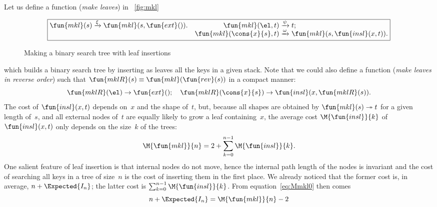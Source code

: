 Let us define a function 
 (\emph{make leaves}) in \fig~\vref{fig:mkl}
\begin{figure}[b]
\begin{equation*}
\boxed{
\begin{array}{@{}r@{\;}l@{\;}lr@{\;}l@{\;}l@{}}
  \fun{mkl}(s) & \xrightarrow{\smash{\xi}} & \fun{mkl}(s,\fun{ext}()).
& \fun{mkl}(\el,t) & \xrightarrow{\smash{\psi}} & t;\\
& & & \fun{mkl}(\cons{x}{s},t) & \xrightarrow{\smash{\omega}} & \fun{mkl}(s,\fun{insl}(x,t)).
\end{array}}
\end{equation*}
\caption{Making a binary search tree with leaf insertions}
\label{fig:mkl}
\end{figure}
which builds a binary search tree by inserting as leaves all the keys
in a given stack. Note that we could also define a function
 (\emph{make leaves in reverse order}) such that
\(\fun{mklR}(s) \equiv \fun{mkl}(\fun{rev}(s))\) in a compact manner:
\begin{equation}
  \fun{mklR}(\el) \rightarrow \fun{ext}();
  \quad
  \fun{mklR}(\cons{x}{s}) \rightarrow \fun{insl}(x,\fun{mklR}(s)).
\label{eq:mklR}
\end{equation}
The cost of \(\fun{insl}(x,t)\) depends on~\(x\) and the shape
of~\(t\), but, because all shapes are obtained by \(\fun{mkl}(s)
\twoheadrightarrow t\) for a given length of~\(s\), and all external
nodes of~\(t\) are equally likely to grow a leaf containing~\(x\), the
average cost \(\M{\fun{insl}}{k}\) of
\(\fun{insl}(x,t)\) only depends on the size~\(k\) of the trees:
\begin{equation}
\abovedisplayskip=2pt
\abovedisplayshortskip=2pt
\belowdisplayskip=4pt
\M{\fun{mkl}}{n} = 2 + \sum_{k=0}^{n-1}\M{\fun{insl}}{k}.
\label{eq:Mmkl0}
\end{equation}
One salient feature of leaf insertion is that internal nodes do not
move, hence the internal path length of the nodes is invariant and the cost of
searching all keys in a tree of size~\(n\) is the cost of inserting
them in the first place. We already noticed that the former cost is,
in average, \(n + \Expected{I_n}\); the latter cost is
\(\sum_{k=0}^{n-1}\M{\fun{insl}}{k}\). From equation~\eqref{eq:Mmkl0}
then comes
\begin{equation}
n + \Expected{I_n} = \M{\fun{mkl}}{n} - 2
\label{eq:n_EIn}
\end{equation}
